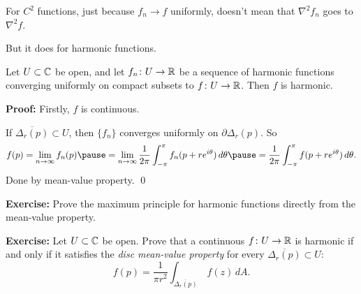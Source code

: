 \documentclass[10pt,aspectratio=169]{beamer}
\begin{document}
\begin{frame}
For $C^2$ functions, just because $f_n \to f$ uniformly,
doesn't mean that $\nabla^2 f_n$ goes to $\nabla^2 f$. 

\medskip
\pause

But it does for harmonic functions.

\pause
\begin{theorem}
Let $U \subset {\mathbb{C}}$ be open, and let $f_n \colon U \to {\mathbb{R}}$ be a sequence of
harmonic functions converging uniformly on compact subsets to $f \colon U
\to {\mathbb{R}}$.  Then $f$ is harmonic.
\end{theorem}

\pause
\textbf{Proof:}
Firstly, $f$ is continuous.

\medskip
\pause

If $\overline{\Delta_r(p)} \subset U$,
then $\{ f_n \}$ converges uniformly on $\partial \Delta_r(p)$.  So
\pause
\begin{equation*}
f(p) =
\lim_{n\to\infty} f_n(p)
\pause
=
\lim_{n\to\infty} 
\frac{1}{2\pi} \int_{-\pi}^{\pi} f_n(p+re^{i\theta})\, d\theta
\pause
=
\frac{1}{2\pi} \int_{-\pi}^{\pi} f(p+re^{i\theta})\, d\theta .
\end{equation*}
\pause
Done by mean-value property. \qed
\end{frame}

\begin{frame}
\textbf{Exercise:}
Prove the maximum principle for harmonic functions directly from the
mean-value property.

\medskip
\pause

\textbf{Exercise:}
Let $U \subset {\mathbb{C}}$ be open.
Prove that a continuous $f \colon U \to {\mathbb{R}}$
is harmonic if and only if it satisfies the
\emph{disc mean-value property} for every $\overline{\Delta_r(p)}
\subset U$:
\[
f(p) = 
\frac{1}{\pi r^2} \int_{\overline{\Delta_r(p)}} \, f(z) \, dA.
\]

\end{frame}
\end{document}
